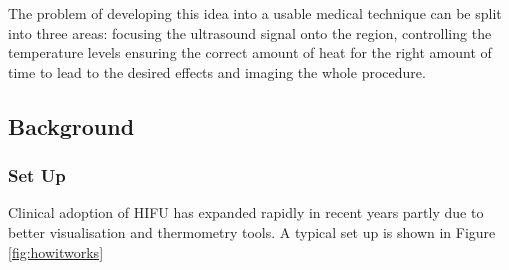 \documentclass[11pt]{article} %
\begin{document}
	The problem of developing this idea into a usable medical technique can be split into three areas: focusing the ultrasound signal onto the region, controlling the temperature levels ensuring the correct amount of heat for the right amount of time to lead to the desired effects and imaging the whole procedure. 
	
	\subsection{Background}
	\subsubsection{Set Up}
	Clinical adoption of HIFU has expanded rapidly in recent years partly due to better visualisation and thermometry tools. A typical set up is shown in Figure \ref{fig:howitworks}
\end{document}

